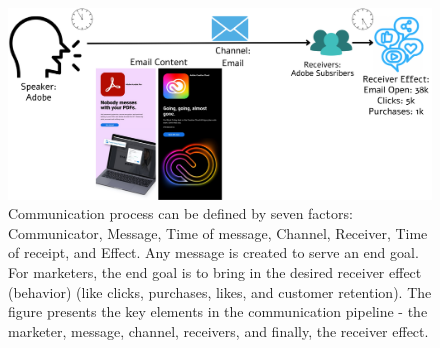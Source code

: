 \documentclass[hidelinks,11pt,a4paper]{report}
\begin{document}

\begin{figure}[h]
  \centering
  \includegraphics[width=1.0\textwidth]{images/factors of communication.pdf}
  \caption{Communication process can be defined by seven factors: Communicator, Message, Time of message, Channel, Receiver, Time of receipt, and Effect. Any message is created to serve an end goal. For marketers, the end goal is to bring in the desired receiver effect (behavior) (like clicks, purchases, likes, and customer retention). The figure presents the key elements in the communication pipeline - the marketer, message, channel, receivers, and finally, the receiver effect.   \label{fig:factors-of-communication}}
\end{figure}
\end{document}

